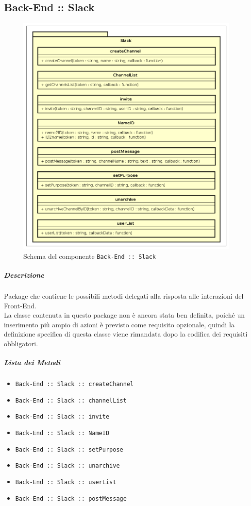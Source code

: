\documentclass[../ManualeSviluppatore_v1.0.0.tex]{subfiles}
\begin{document}
\subsection{Back-End :: Slack}
\begin{figure}[!h]
	\centering
	\includegraphics[scale=0.6]{Architettura/Back-End/Slack.png}
	\caption{Schema del componente \texttt{Back-End :: Slack}}
\end{figure}
\subparagraph{Descrizione} Package che contiene le possibili metodi delegati alla risposta alle interazioni del Front-End.\\
La classe contenuta in questo package non è ancora stata ben definita, poiché un inserimento più ampio di azioni è previsto come requisito opzionale, quindi la definizione specifica di questa classe viene rimandata dopo la codifica dei requisiti obbligatori.
\subparagraph{Lista dei Metodi}
\begin{itemize}
\item \texttt{Back-End :: Slack :: createChannel}
\item \texttt{Back-End :: Slack :: channelList}
\item \texttt{Back-End :: Slack :: invite}
\item \texttt{Back-End :: Slack :: NameID}
\item \texttt{Back-End :: Slack :: setPurpose}
\item \texttt{Back-End :: Slack :: unarchive}
\item \texttt{Back-End :: Slack :: userList}
\item \texttt{Back-End :: Slack :: postMessage}
\end{itemize}
\end{document}
